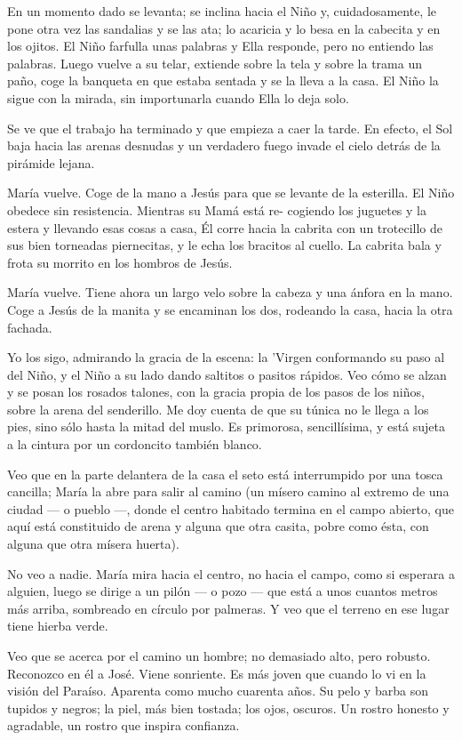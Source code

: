 \documentclass[12pt]{book} %
\begin{document}
En un momento dado se levanta; se inclina hacia el Niño y, cuidadosamente, le pone otra vez las sandalias y se las ata; lo acaricia y lo besa en la cabecita y en los ojitos. El Niño farfulla unas palabras y Ella responde, pero no entiendo las palabras. Luego vuelve a su telar, extiende sobre la tela y sobre la trama un paño, coge la banqueta en que estaba sentada y se la lleva a la casa. El Niño la sigue con la mirada, sin importunarla cuando Ella lo deja solo. 

Se ve que el trabajo ha terminado y que empieza a caer la tarde. En efecto, el Sol baja hacia las arenas desnudas y un verdadero fuego invade el cielo detrás de la pirámide lejana. 

María vuelve. Coge de la mano a Jesús para que se levante de la esterilla. El Niño obedece sin resistencia. Mientras su Mamá está re- cogiendo los juguetes y la estera y llevando esas cosas a casa, Él corre hacia la cabrita con un trotecillo de sus bien torneadas piernecitas, y le echa los bracitos al cuello. La cabrita bala y frota su morrito en los hombros de Jesús. 

María vuelve. Tiene ahora un largo velo sobre la cabeza y una ánfora en la mano. Coge a Jesús de la manita y se encaminan los dos, rodeando la casa, hacia la otra fachada. 

Yo los sigo, admirando la gracia de la escena: la 'Virgen conformando su paso al del Niño, y el Niño a su lado dando saltitos o pasitos rápidos. Veo cómo se alzan y se posan los rosados talones, con la gracia propia de los pasos de los niños, sobre la arena del senderillo. Me doy cuenta de que su túnica no le llega a los pies, sino sólo hasta la mitad del muslo. Es primorosa, sencillísima, y está sujeta a la cintura por un cordoncito también blanco. 

Veo que en la parte delantera de la casa el seto está interrumpido por una tosca cancilla; María la abre para salir al camino (un mísero camino al extremo de una ciudad — o pueblo —, donde el centro habitado termina en el campo abierto, que aquí está constituido de arena y alguna que otra casita, pobre como ésta, con alguna que otra mísera huerta). 

No veo a nadie. María mira hacia el centro, no hacia el campo, como si esperara a alguien, luego se dirige a un pilón — o pozo — que está a unos cuantos metros más arriba, sombreado en círculo por palmeras. Y veo que el terreno en ese lugar tiene hierba verde. 

Veo que se acerca por el camino un hombre; no demasiado alto, pero robusto. Reconozco en él a José. Viene sonriente. Es más joven que cuando lo vi en la visión del Paraíso. Aparenta como mucho cuarenta años. Su pelo y barba son tupidos y negros; la piel, más bien tostada; los ojos, oscuros. Un rostro honesto y agradable, un rostro que inspira confianza. 
\end{document}
